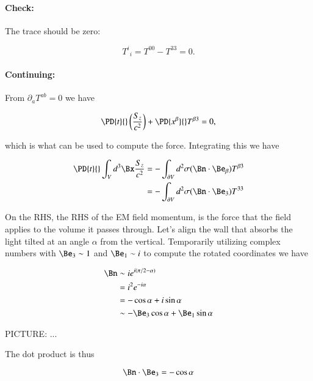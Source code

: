 \paragraph{Check:} The trace should be zero:

\begin{equation}\label{eqn:relativisticElectrodynamicsPS6P1:580}
{T^i}_i = T^{0 0} - T^{3 3} = 0.
\end{equation}

\paragraph{Continuing:}

From $\partial_a T^{a b} = 0$ we have

\begin{equation}\label{eqn:relativisticElectrodynamicsPS6P1:600}
\PD{t}{} \left( \frac{S_z}{c^2} \right) + \PD{x^\beta}{} T^{\beta 3} = 0,
\end{equation}

which is what can be used to compute the force.  Integrating this we have

\begin{align*}
\PD{t}{} \int_V d^3 \Bx \frac{S_z}{c^2} 
&= - \int_{\partial V} d^2 \sigma (\Bn \cdot \Be_\beta) T^{\beta 3} \\
&= - \int_{\partial V} d^2 \sigma (\Bn \cdot \Be_3) T^{3 3} 
\end{align*}

On the RHS, the RHS of the EM field momentum, is the force that the field applies to the volume it passes through.  Let's align the wall that absorbs the light tilted at an angle $\alpha$ from the vertical.  Temporarily utilizing complex numbers with $\Be_3 \sim 1$ and $\Be_1 \sim i$ to compute the rotated coordinates we have

\begin{align*}
\Bn 
&\sim i e^{i (\pi/2 - \alpha)} \\
&= i^2 e^{-i \alpha} \\
&= -\cos\alpha + i \sin\alpha \\
&\sim
-\Be_3 \cos\alpha + \Be_1 \sin\alpha
\end{align*}

PICTURE: ...

The dot product is thus

\begin{equation}\label{eqn:relativisticElectrodynamicsPS6P1:620}
\Bn \cdot \Be_3 = -\cos\alpha
\end{equation}

